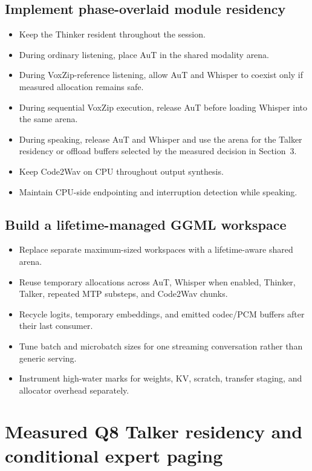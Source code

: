 \documentclass[10pt,letterpaper]{article}
\begin{document}
\subsection{Implement phase-overlaid module residency}
\begin{itemize}
    \item Keep the Thinker resident throughout the session.
    \item During ordinary listening, place AuT in the shared modality arena.
    \item During VoxZip-reference listening, allow AuT and Whisper to coexist only if measured allocation remains safe.
    \item During sequential VoxZip execution, release AuT before loading Whisper into the same arena.
    \item During speaking, release AuT and Whisper and use the arena for the Talker residency or offload buffers selected by the measured decision in Section~3.
    \item Keep Code2Wav on CPU throughout output synthesis.
    \item Maintain CPU-side endpointing and interruption detection while speaking.
\end{itemize}

\subsection{Build a lifetime-managed GGML workspace}
\begin{itemize}
    \item Replace separate maximum-sized workspaces with a lifetime-aware shared arena.
    \item Reuse temporary allocations across AuT, Whisper when enabled, Thinker, Talker, repeated MTP substeps, and Code2Wav chunks.
    \item Recycle logits, temporary embeddings, and emitted codec/PCM buffers after their last consumer.
    \item Tune batch and microbatch sizes for one streaming conversation rather than generic serving.
    \item Instrument high-water marks for weights, KV, scratch, transfer staging, and allocator overhead separately.
\end{itemize}

\section{Measured Q8 Talker residency and conditional expert paging}
\end{document}
